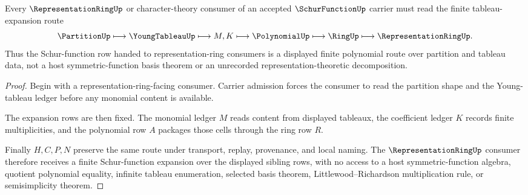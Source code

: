 \begin{theorem}
\label{thm:schur-function-tableau-expansion-handoff}
Every $\RepresentationRingUp$ or character-theory consumer of an accepted $\SchurFunctionUp$ carrier must read the finite tableau-expansion route
$$
\PartitionUp
\longmapsto
\YoungTableauUp
\longmapsto
M,K
\longmapsto
\PolynomialUp
\longmapsto
\RingUp
\longmapsto
\RepresentationRingUp .
$$
Thus the Schur-function row handed to representation-ring consumers is a displayed finite polynomial route over partition and tableau data, not a host symmetric-function basis theorem or an unrecorded representation-theoretic decomposition.
\end{theorem}
\begin{proof}
Begin with a representation-ring-facing consumer. Carrier admission forces the consumer to read the partition shape and the Young-tableau ledger before any monomial content is available.

The expansion rows are then fixed. The monomial ledger $M$ reads content from displayed tableaux, the coefficient ledger $K$ records finite multiplicities, and the polynomial row $A$ packages those cells through the ring row $R$.

Finally $H,C,P,N$ preserve the same route under transport, replay, provenance, and local naming. The $\RepresentationRingUp$ consumer therefore receives a finite Schur-function expansion over the displayed sibling rows, with no access to a host symmetric-function algebra, quotient polynomial equality, infinite tableau enumeration, selected basis theorem, Littlewood--Richardson multiplication rule, or semisimplicity theorem.
\end{proof}



